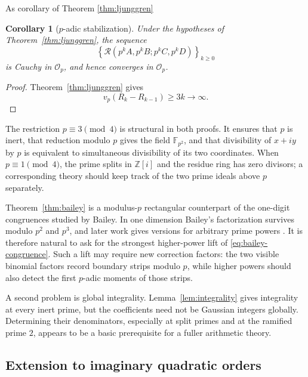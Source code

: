 \documentclass[a4paper,american,11pt]{amsart}
\numberwithin{equation}{section}
\newtheorem{corollary}[theorem]{Corollary}
\theoremstyle{definition}
\newcommand{\Z}{\mathbb Z}
\newcommand{\F}{\mathbb F}
\newcommand{\Op}{\mathcal O_p}
\newcommand{\Rect}{\mathcal R}
\newcommand{\vp}{v_p}
\begin{document}
As corollary of Theorem \ref{thm:ljunggren} 
 
\begin{corollary}[$p$-adic stabilization]\label{cor:padic-limit}
Under the hypotheses of Theorem~\ref{thm:ljunggren}, the sequence
\[
\left\{\Rect(p^kA,p^kB;p^kC,p^kD)\right\}_{k\geq0}
\]
is Cauchy in $\Op$, and hence converges in $\Op$.
\end{corollary}

\begin{proof}
Theorem~\ref{thm:ljunggren} gives
\[
\vp(R_k-R_{k-1})\geq3k\longrightarrow\infty.
\]
\end{proof}

The restriction $p\equiv3\pmod4$ is structural in both proofs. It ensures that $p$ is inert, that reduction modulo $p$ gives the field $\F_{p^2}$, and that divisibility of $x+iy$ by $p$ is equivalent to simultaneous divisibility of its two coordinates. When $p\equiv1\pmod4$, the prime splits in $\Z[i]$ and the residue ring has zero divisors; a corresponding theory should keep track of the two prime ideals above $p$ separately.

Theorem~\ref{thm:bailey} is a modulus-$p$ rectangular counterpart of the one-digit congruences studied by Bailey. In one dimension Bailey's factorization survives modulo $p^2$ and $p^3$, and later work gives versions for arbitrary prime powers \cite{Bailey1990,Bailey1992,DavisWebb1990,Granville1997}. It is therefore natural to ask for the strongest higher-power lift of \eqref{eq:bailey-congruence}. Such a lift may require new correction factors: the two visible binomial factors record boundary strips modulo $p$, while higher powers should also detect the first $p$-adic moments of those strips.

A second problem is global integrality. Lemma~\ref{lem:integrality} gives integrality at every inert prime, but the coefficients need not be Gaussian integers globally. Determining their denominators, especially at split primes and at the ramified prime $2$, appears to be a basic prerequisite for a fuller arithmetic theory.



\subsection{Extension to imaginary quadratic orders}\label{subsec:quadratic-orders}
\end{document}
